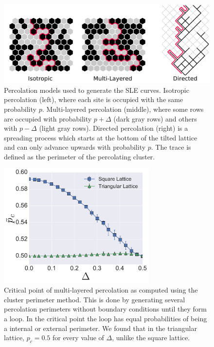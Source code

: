 \begin{figure}
\begin{center}
    \includegraphics[width=\textwidth]{chapters/ch6-asle/figs/models}
\end{center}
\caption{Percolation models used to generate the SLE curves. Isotropic
    percolation (left), where each site is occupied with the same probability
    $p$. Multi-layered percolation (middle), where some rows are occupied with
    probability $p+\Delta$ (dark gray rows) and others with $p-\Delta$ (light
    gray rows). Directed percolation (right) is a spreading process which
    starts at the bottom of the tilted lattice and can only advance upwards
    with probability $p$. The trace is defined as the perimeter of the
    percolating cluster.}
\label{fig:models}
\end{figure}

\begin{figure}
\begin{center}
    \includegraphics[width=0.7\textwidth]{chapters/ch6-asle/figs/mlp_ps}
\end{center}
\caption{Critical point of multi-layered percolation as computed using the
    cluster perimeter method. This is done by generating several percolation
    perimeters without boundary conditions until they form a loop. In the
    critical point the loop has equal probabilities of being a internal or
    external perimeter. We found that in the triangular lattice, $p_c=0.5$
    for every value of $\Delta$, unlike the square lattice.}
\label{fig:mlp_ps}
\end{figure}




